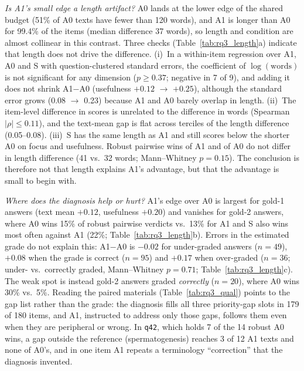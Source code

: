 \emph{Is A1's small edge a length artifact?} A0 lands at the lower edge of the shared budget (51\% of A0 texts have fewer than 120 words), and A1 is longer than A0 for 99.4\% of the items (median difference 37 words), so length and condition are almost collinear in this contrast. Three checks (Table~\ref{tab:rq3_length}a) indicate that length does not drive the difference. (i)~In a within-item regression over A1, A0 and S with question-clustered standard errors, the coefficient of $\log(\text{words})$ is not significant for any dimension ($p\ge 0.37$; negative in 7 of 9), and adding it does not shrink A1$-$A0 (usefulness $+0.12$ $\to$ $+0.25$), although the standard error grows (0.08 $\to$ 0.23) because A1 and A0 barely overlap in length. (ii)~The item-level difference in scores is unrelated to the difference in words (Spearman $|\rho|\le 0.11$), and the text-mean gap is flat across terciles of the length difference (0.05--0.08). (iii)~S has the same length as A1 and still scores below the shorter A0 on focus and usefulness. Robust pairwise wins of A1 and of A0 do not differ in length difference (41 vs.\ 32 words; Mann--Whitney $p{=}0.15$). The conclusion is therefore not that length explains A1's advantage, but that the advantage is small to begin with.

\emph{Where does the diagnosis help or hurt?} A1's edge over A0 is largest for gold-1 answers (text mean $+0.12$, usefulness $+0.20$) and vanishes for gold-2 answers, where A0 wins 15\% of robust pairwise verdicts vs.\ 13\% for A1 and S also wins most often against A1 (22\%; Table~\ref{tab:rq3_length}b). Errors in the estimated grade do not explain this: A1$-$A0 is $-0.02$ for under-graded answers ($n{=}49$), $+0.08$ when the grade is correct ($n{=}95$) and $+0.17$ when over-graded ($n{=}36$; under- vs.\ correctly graded, Mann--Whitney $p{=}0.71$; Table~\ref{tab:rq3_length}c). The weak spot is instead gold-2 answers graded \emph{correctly} ($n{=}20$), where A0 wins 30\% vs.\ 5\%. Reading the paired materials (Table~\ref{tab:rq3_qual}) points to the gap list rather than the grade: the diagnosis fills all three priority-gap slots in 179 of 180 items, and A1, instructed to address only those gaps, follows them even when they are peripheral or wrong. In \texttt{q42}, which holds 7 of the 14 robust A0 wins, a gap outside the reference (spermatogenesis) reaches 3 of 12 A1 texts and none of A0's, and in one item A1 repeats a terminology ``correction'' that the diagnosis invented.

